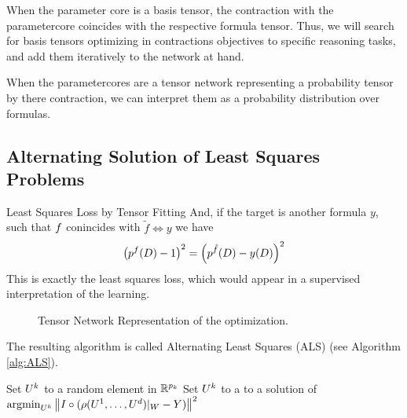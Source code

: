 \begin{remark}
	When the parameter core is a basis tensor, the contraction with the parametercore coincides with the respective formula tensor.
	Thus, we will search for basis tensors optimizing in contractions objectives to specific reasoning tasks, and add them iteratively to the network at hand.
\end{remark}

When the parametercores are a tensor network representing a probability tensor by there contraction, we can interpret them as a probability distribution over formulas.






\subsection{Alternating Solution of Least Squares Problems}


\begin{remark}{Least Squares Loss by Tensor Fitting}
	And, if the target is another formula $y$, such that $f$ conincides with $\tilde{f} \iff y $ we have
		\[ \left(p^{f}(D)-1\right)^2 = \left(  p^{\tilde{f}}(D) - y(D) \right)^2  \]
	This is exactly the least squares loss, which would appear in a supervised interpretation of the learning.


\end{remark}


\begin{figure}[h]
\begin{center}
    
\end{center}
\caption{ Tensor Network Representation of the optimization.}
\end{figure}


The resulting algorithm is called Alternating Least Squares (ALS) (see Algorithm \ref{alg:ALS}).

\begin{algorithm}[hbt!]
\caption{Alternating Least Squares (ALS)}\label{alg:ALS}
\begin{algorithmic}
\For{$\atomenumeratorin$}
	\State Set $U^{k}$ to a random element in $\mathbb{R}^{p_{k}}$ 
\EndFor
{}
\For{$\atomenumeratorin$}
	\State Set $U^{k}$ to a to a solution of $ \mathrm{argmin}_{U^{k}}  \left\|  I \circ ( {\rho(U^{1},\ldots,U^{d})}|_{W} - Y ) \right\|^2$
\EndFor
\EndWhile
\end{algorithmic}
\end{algorithm}



